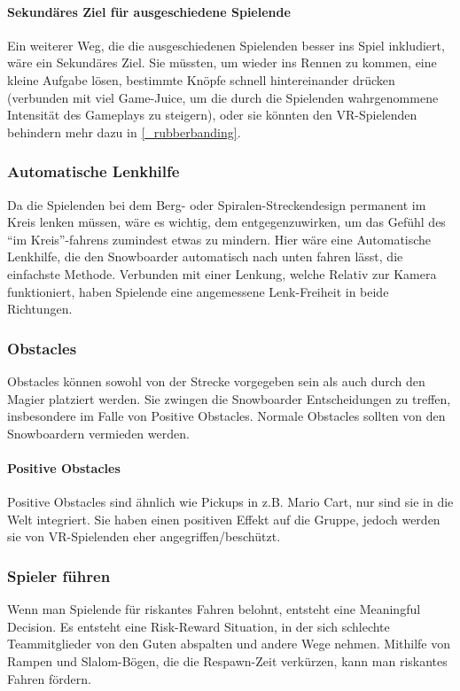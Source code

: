 \paragraph{Sekundäres Ziel für ausgeschiedene Spielende}
Ein weiterer Weg, die die ausgeschiedenen Spielenden besser ins Spiel inkludiert, wäre ein Sekundäres Ziel. Sie müssten, um wieder ins Rennen zu kommen, eine kleine Aufgabe lösen, bestimmte Knöpfe schnell hintereinander drücken (verbunden mit viel Game-Juice, um die durch die Spielenden wahrgenommene Intensität des Gameplays zu steigern), oder sie könnten den VR-Spielenden behindern mehr dazu in \ref{_rubberbanding}.

\subsubsection{Automatische Lenkhilfe}
Da die Spielenden bei dem Berg- oder Spiralen-Streckendesign permanent im Kreis lenken müssen, wäre es wichtig, dem entgegenzuwirken, um das Gefühl des "`im Kreis"'-fahrens zumindest etwas zu mindern. Hier wäre eine Automatische Lenkhilfe, die den Snowboarder automatisch nach unten fahren lässt, die einfachste Methode. Verbunden mit einer Lenkung, welche Relativ zur Kamera funktioniert, haben Spielende eine angemessene Lenk-Freiheit in beide Richtungen.

\subsubsection{Obstacles}
Obstacles können sowohl von der Strecke vorgegeben sein als auch durch den Magier platziert werden. Sie zwingen die Snowboarder Entscheidungen zu treffen, insbesondere im Falle von Positive Obstacles. Normale Obstacles sollten von den Snowboardern vermieden werden.

\paragraph{Positive Obstacles}
Positive Obstacles sind ähnlich wie Pickups in z.B. Mario Cart, nur sind sie in die Welt integriert. Sie haben einen positiven Effekt auf die Gruppe, jedoch werden sie von VR-Spielenden eher angegriffen/beschützt.

\subsubsection{Spieler führen}
Wenn man Spielende für riskantes Fahren belohnt, entsteht eine Meaningful Decision. Es entsteht eine Risk-Reward Situation, in der sich schlechte Teammitglieder von den Guten abspalten und andere Wege nehmen. Mithilfe von Rampen und Slalom-Bögen, die die Respawn-Zeit verkürzen, kann man riskantes Fahren fördern.

